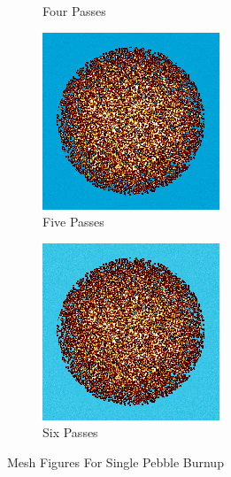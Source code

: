 \begin{figure}[h!]
\begin{subfigure}{0.25\textwidth}
  \caption{Four Passes}
  \label{fig:bstep4}
\end{subfigure}%
%
\begin{subfigure}{0.25\textwidth}
  \includegraphics[width=0.95\linewidth]{figures/burn-20-bstep5}
  \caption{Five Passes}
  \label{fig:bstep5}
\end{subfigure}%

\begin{subfigure}{0.25\textwidth}
  \includegraphics[width=0.95\linewidth]{figures/burn-20-bstep6}
  \caption{Six Passes}
  \label{fig:bstep6}
\end{subfigure}%
%
\caption{Mesh Figures For Single Pebble Burnup}
\label{fig:burn-meshes}
\end{figure}